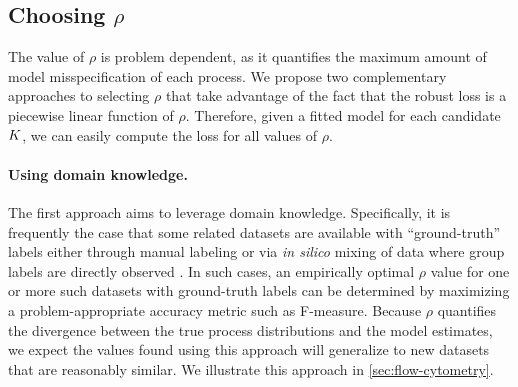 \subsection{Choosing $\rho$} \label{sec:choosing-rho}

The value of $\rho$ is problem dependent, as it quantifies the maximum amount of model misspecification of each process.
We propose two complementary approaches to selecting $\rho$ that
take advantage of the fact that the robust loss is a piecewise linear function of $\rho$.
Therefore, given a fitted model for each candidate $K$, we can easily compute the loss for all values of $\rho$.

\paragraph{Using domain knowledge.}
The first approach aims to leverage domain knowledge. %
Specifically, it is frequently the case that some related datasets are available with ``ground-truth'' labels either
through manual labeling or via \emph{in silico} mixing of data where group labels are directly observed \citep[see, e.g.,][]{Souto:2008}.
In such cases, an empirically optimal $\rho$ value %
for one or more such datasets with ground-truth labels
can be determined by maximizing a problem-appropriate accuracy metric such as F-measure.
Because $\rho$ quantifies the divergence between the true process distributions and the model estimates,
we expect the values found using this approach will generalize to new datasets that are reasonably similar.
We illustrate this approach in \cref{sec:flow-cytometry}.

